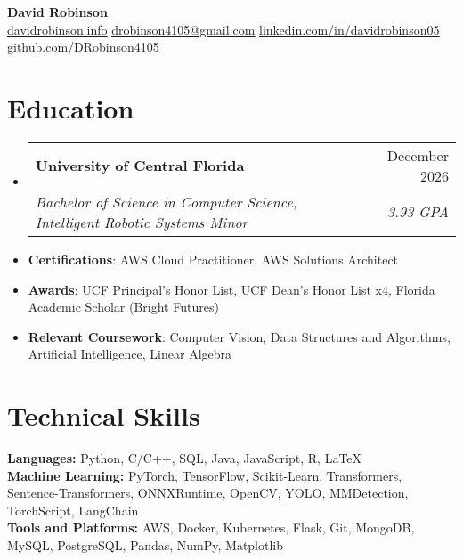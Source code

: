 \documentclass[letterpaper,11pt]{article}
\makeatletter
\newcommand{\educationItem}[1]{
  \item\small{
    {#1 \vspace{-5pt}}
  }
}
\newcommand{\resumeSubheading}[4]{
  \vspace{-2pt}\item
    \begin{tabular*}{0.97\textwidth}[t]{l@{\extracolsep{\fill}}r}
      \textbf{#1} & #2 \\
      \textit{\small#3} & \textit{\small #4} \\
    \end{tabular*}\vspace{-7pt}
}
\newcommand{\resumeSubHeadingListStart}{\begin{itemize}[leftmargin=0.15in, label={}]}
\newcommand{\resumeSubHeadingListEnd}{\end{itemize}}
\makeatother
\begin{document}
\begin{center}
  \textbf{\Huge David Robinson} \\ \vspace{2pt} \small
  \faCode\hspace{0.25pt} \href{https://www.davidrobinson.info/}{\uline{davidrobinson.info}}
  \faEnvelope\hspace{0.25pt} \href{mailto:drobinson4105@gmail.com}{\uline{drobinson4105@gmail.com}}
  \faLinkedin\hspace{0.25pt} \href{https://linkedin.com/in/davidrobinson05}{\uline{linkedin.com/in/davidrobinson05}}
  \faGithub\hspace{0.25pt} \href{https://github.com/DRobinson4105}{\uline{github.com/DRobinson4105}}
\end{center}

\section{Education}
  \resumeSubHeadingListStart
    \resumeSubheading
      {University of Central Florida}{December 2026}
      {Bachelor of Science in Computer Science, Intelligent Robotic Systems Minor}{3.93 GPA}
    \educationItem{\textbf{Certifications}: AWS Cloud Practitioner, AWS Solutions Architect}
    \educationItem{\textbf{Awards}: UCF Principal's Honor List, UCF Dean's Honor List x4, Florida Academic Scholar (Bright Futures)}
    \educationItem{\textbf{Relevant Coursework}: Computer Vision, Data Structures and Algorithms, Artificial Intelligence, Linear Algebra}
  \resumeSubHeadingListEnd

\section{Technical Skills}
  \begin{itemize}[leftmargin=0.15in, label={}]
    \small{\item{
      \textbf{Languages:}{ Python, C/C++, SQL, Java, JavaScript, R, LaTeX} \\
      \textbf{Machine Learning:}{ PyTorch, TensorFlow, Scikit-Learn, Transformers, Sentence-Transformers, ONNXRuntime, OpenCV, YOLO, MMDetection, TorchScript, LangChain} \\
      \textbf{Tools and Platforms:}{ AWS, Docker, Kubernetes, Flask, Git, MongoDB, MySQL, PostgreSQL, Pandas, NumPy, Matplotlib}
    }}
  \end{itemize}
\end{document}
